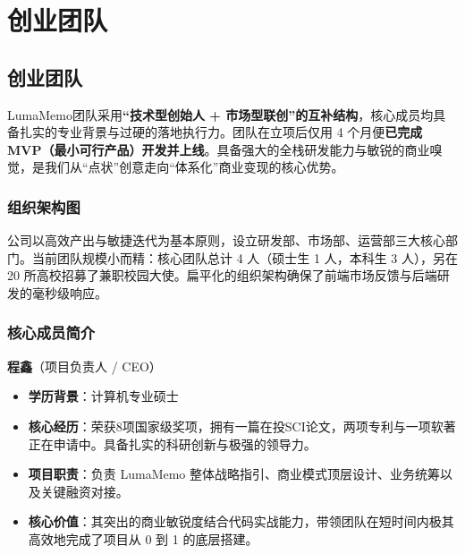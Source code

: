 
\chapter{创业团队}

\section{创业团队}

LumaMemo团队采用\textbf{“技术型创始人 + 市场型联创”的互补结构}，核心成员均具备扎实的专业背景与过硬的落地执行力。团队在立项后仅用 4 个月便\textbf{已完成 MVP（最小可行产品）开发并上线}。具备强大的全栈研发能力与敏锐的商业嗅觉，是我们从“点状”创意走向“体系化”商业变现的核心优势。

\subsection{组织架构图}

公司以高效产出与敏捷迭代为基本原则，设立研发部、市场部、运营部三大核心部门。当前团队规模小而精：核心团队总计 4 人（硕士生 1 人，本科生 3 人），另在 20 所高校招募了兼职校园大使。扁平化的组织架构确保了前端市场反馈与后端研发的毫秒级响应。


\subsection{核心成员简介}

\textbf{程鑫}（项目负责人 / CEO）
\begin{itemize}
    \item \textbf{学历背景}：计算机专业硕士
    \item \textbf{核心经历}：荣获8项国家级奖项，拥有一篇在投SCI论文，两项专利与一项软著正在申请中。具备扎实的科研创新与极强的领导力。
    \item \textbf{项目职责}：负责 LumaMemo 整体战略指引、商业模式顶层设计、业务统筹以及关键融资对接。
    \item \textbf{核心价值}：其突出的商业敏锐度结合代码实战能力，带领团队在短时间内极其高效地完成了项目从 0 到 1 的底层搭建。
\end{itemize}

